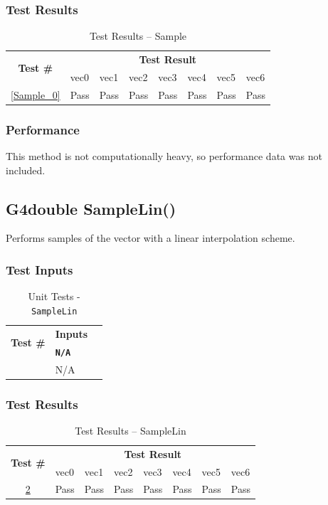 \documentclass[12pt]{article}
\newcounter{TestCounter}
\begin{document}
	\subsubsection{Test Results}
		\begin{table}[H]
		\centering
		\caption{Test Results -- Sample}\label{Sample_acc}
		\begin{tabular}{clllllll}
		\toprule
		\multirow{2}{*}{\bf Test \#} & \multicolumn{7}{c}{\bf Test Result}\\
		& vec0 & vec1 & vec2 & vec3 & vec4 & vec5 & vec6\\\midrule
		\ref{Sample_0} & Pass & Pass & Pass & Pass & Pass & Pass & Pass\\
		\bottomrule
		\end{tabular}
		\end{table}

	\subsubsection{Performance}
		This method is not computationally heavy, so performance data was not included.


\subsection{G4double SampleLin()}%
	
	 Performs samples of the vector with a linear interpolation scheme.
	
	\subsubsection{Test Inputs}
		\begin{table}[H]
		\centering
		\caption{Unit Tests - \texttt{SampleLin}}\label{SampleLin_unit}
		\begin{tabular}{lll}
		\toprule
		\multirow{2}{*}{\bf Test \#}  & \multicolumn{1}{c}{\bf Inputs}\\
		& \bf \texttt{N/A}\\\midrule
		{TestCounter}\arabic{TestCounter}\label{SampleLin_0} & N/A \\
		\bottomrule
		\end{tabular}
		\end{table}
	
	\subsubsection{Test Results}
		\begin{table}[H]
		\centering
		\caption{Test Results -- SampleLin}\label{SampleLin_acc}
		\begin{tabular}{clllllll}
		\toprule
		\multirow{2}{*}{\bf Test \#} & \multicolumn{7}{c}{\bf Test Result}\\
		& vec0 & vec1 & vec2 & vec3 & vec4 & vec5 & vec6\\\midrule
		\ref{SampleLin_0} & Pass & Pass & Pass & Pass & Pass & Pass & Pass\\
		\bottomrule
		\end{tabular}
		\end{table}
\end{document}
